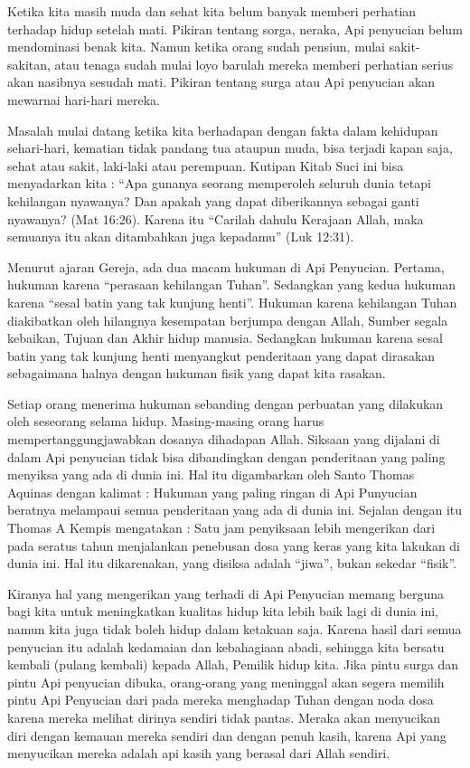	

Ketika kita masih muda dan sehat kita belum banyak memberi perhatian terhadap hidup setelah mati. Pikiran tentang sorga, neraka, Api penyucian belum mendominasi benak kita. Namun ketika orang sudah pensiun, mulai sakit-sakitan, atau tenaga sudah mulai loyo barulah mereka memberi perhatian serius akan nasibnya sesudah mati. Pikiran tentang surga atau Api penyucian akan mewarnai hari-hari mereka.

Masalah mulai datang ketika kita
berhadapan dengan fakta dalam kehidupan sehari-hari, kematian tidak pandang tua ataupun muda, bisa terjadi kapan saja, sehat atau sakit, laki-laki atau perempuan. Kutipan Kitab Suci ini bisa menyadarkan kita : “Apa gunanya seorang memperoleh seluruh dunia tetapi kehilangan nyawanya? Dan apakah yang dapat diberikannya sebagai ganti nyawanya? (Mat 16:26).  Karena itu “Carilah dahulu Kerajaan Allah, maka semuanya itu akan ditambahkan juga kepadamu” (Luk 12:31).

     Menurut ajaran Gereja, ada dua macam hukuman di Api Penyucian. Pertama, hukuman karena “perasaan kehilangan Tuhan”. Sedangkan yang kedua hukuman karena “sesal batin yang tak kunjung henti”. Hukuman karena kehilangan Tuhan diakibatkan oleh hilangnya kesempatan berjumpa dengan Allah, Sumber segala kebaikan, Tujuan dan Akhir hidup manusia. Sedangkan hukuman karena sesal batin yang tak kunjung henti menyangkut penderitaan yang dapat dirasakan sebagaimana halnya dengan hukuman fisik yang dapat kita rasakan.

     Setiap orang menerima hukuman sebanding dengan perbuatan yang dilakukan oleh seseorang selama hidup. Masing-masing orang harus mempertanggungjawabkan dosanya dihadapan Allah. Siksaan yang dijalani di dalam Api penyucian tidak bisa dibandingkan dengan penderitaan yang paling menyiksa yang ada di dunia ini. Hal itu digambarkan oleh Santo Thomas Aquinas dengan kalimat : Hukuman yang paling ringan di Api Punyucian beratnya melampaui semua penderitaan yang ada di dunia ini. Sejalan dengan itu Thomas A Kempis mengatakan : Satu jam penyiksaan lebih mengerikan dari pada seratus tahun menjalankan penebusan dosa yang keras yang kita lakukan di dunia ini. Hal itu dikarenakan, yang disiksa adalah “jiwa”, bukan sekedar “fisik”.

     Kiranya hal yang mengerikan yang terhadi di Api Penyucian memang berguna bagi kita untuk meningkatkan kualitas hidup kita lebih baik lagi di dunia ini, namun kita juga tidak boleh hidup dalam ketakuan saja. Karena hasil dari semua penyucian itu adalah kedamaian dan kebahagiaan abadi, sehingga kita bersatu kembali (pulang kembali) kepada Allah, Pemilik hidup kita. Jika pintu surga dan pintu Api penyucian dibuka, orang-orang yang meninggal akan segera memilih pintu Api Penyucian dari pada mereka menghadap Tuhan dengan noda dosa karena mereka melihat dirinya sendiri tidak pantas. Meraka akan menyucikan diri dengan kemauan mereka sendiri dan dengan penuh kasih, karena Api yang menyucikan mereka adalah api kasih yang berasal dari Allah sendiri.

